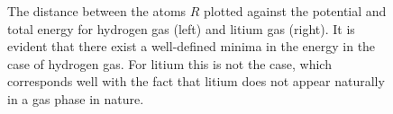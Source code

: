 \begin{figure}
 \begin{center}
  \caption{The distance between the atoms $R$ plotted against the potential and total energy for hydrogen gas (left) and litium gas (right). It is evident that there exist a well-defined minima in the energy in the case of hydrogen gas. For litium this is not the case, which corresponds well with the fact that litium does not appear naturally in a gas phase in nature.}
  \label{fig:molecules_R_vs_E}
 \end{center}
\end{figure}
